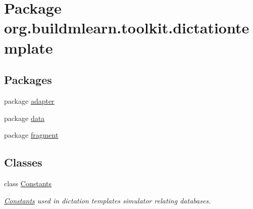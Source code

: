 \hypertarget{namespaceorg_1_1buildmlearn_1_1toolkit_1_1dictationtemplate}{}\section{Package org.\+buildmlearn.\+toolkit.\+dictationtemplate}
\label{namespaceorg_1_1buildmlearn_1_1toolkit_1_1dictationtemplate}
\subsection*{Packages}
\begin{DoxyCompactItemize}
\item 
package \hyperlink{namespaceorg_1_1buildmlearn_1_1toolkit_1_1dictationtemplate_1_1adapter}{adapter}
\item 
package \hyperlink{namespaceorg_1_1buildmlearn_1_1toolkit_1_1dictationtemplate_1_1data}{data}
\item 
package \hyperlink{namespaceorg_1_1buildmlearn_1_1toolkit_1_1dictationtemplate_1_1fragment}{fragment}
\end{DoxyCompactItemize}
\subsection*{Classes}
\begin{DoxyCompactItemize}
\item 
class \hyperlink{classorg_1_1buildmlearn_1_1toolkit_1_1dictationtemplate_1_1Constants}{Constants}
\begin{DoxyCompactList}\small\item\em \hyperlink{classorg_1_1buildmlearn_1_1toolkit_1_1dictationtemplate_1_1Constants}{Constants} used in dictation template\textquotesingle{}s simulator relating databases. \end{DoxyCompactList}\end{DoxyCompactItemize}
